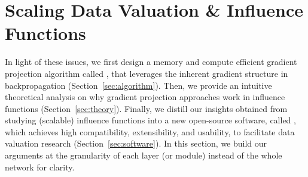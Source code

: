 \section{Scaling Data Valuation \& Influence Functions}
\label{sec:method}
In light of these issues, we first design a memory and compute efficient gradient projection algorithm called \method, that leverages the inherent gradient structure in backpropagation (Section~\ref{sec:algorithm}). Then, we provide an intuitive theoretical analysis on why gradient projection approaches work in influence functions (Section~\ref{sec:theory}). Finally, we distill our insights obtained from studying (scalable) influence functions into a new open-source software, called \software, which achieves high compatibility, extensibility, and usability, to facilitate data valuation research  (Section~\ref{sec:software}). In this section, we build our arguments at the granularity of each layer (or module) instead of the whole network for clarity.


